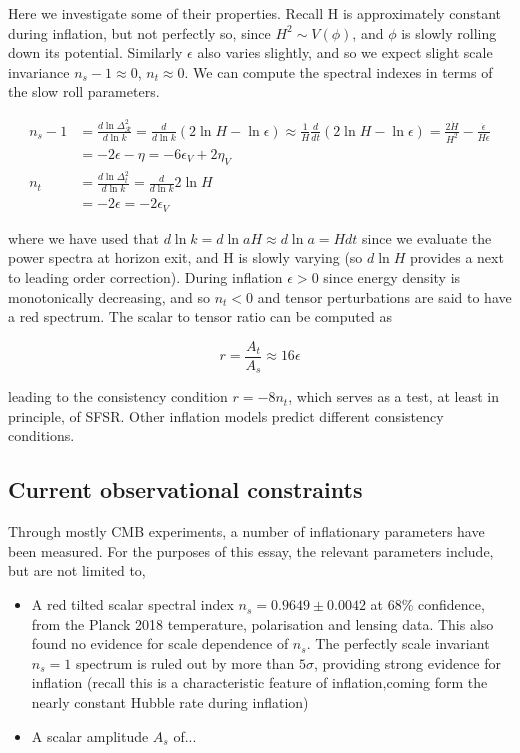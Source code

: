 \documentclass[a4paper,10pt]{article}
\begin{document}
Here we investigate some of their properties. Recall H is approximately constant during inflation, but not perfectly so, since $H^2 \sim V(\phi)$, and $\phi$ is slowly rolling down its potential. Similarly $\epsilon$ also varies slightly, and so we expect slight scale invariance $n_s-1\approx0$, $n_t\approx0$. We can compute the spectral indexes in terms of the slow roll parameters. 

\begin{equation}\begin{split}
n_s-1 &= \frac{d\ln{\Delta^2_{\mathcal{R}}}}{d\ln{k}} = \frac{d}{d\ln{k}}(2\ln{H}-\ln{\epsilon}) \approx \frac{1}{H}\frac{d}{dt}(2\ln{H}-\ln{\epsilon}) = \frac{2\dot{H}}{H^2}-\frac{\dot{\epsilon}}{H\epsilon}\\
& = -2\epsilon-\eta = -6\epsilon_V+2\eta_V\\
n_t &= \frac{d\ln{\Delta^2_t}}{d\ln{k}} = \frac{d}{d\ln{k}}2\ln{H}\\
&=-2\epsilon=-2\epsilon_V
\end{split}\end{equation}

where we have used that $d\ln{k} = d\ln{aH} \approx d\ln{a} = Hdt$ since we evaluate the power spectra at horizon exit, and H is slowly varying (so $d\ln{H}$ provides a next to leading order correction). During inflation $\epsilon>0$ since energy density is monotonically decreasing, and so $n_t<0$ and tensor perturbations are said to have a red spectrum. The scalar to tensor ratio can be computed as

\begin{equation}
r=\frac{A_t}{A_s} \approx 16\epsilon
\end{equation}

leading to the consistency condition $r=-8n_t$, which serves as a test, at least in principle, of SFSR. Other inflation models predict different consistency conditions.


\subsection{Current observational constraints}


Through mostly CMB experiments, a number of inflationary parameters have been measured. For the purposes of this essay, the relevant parameters include, but are not limited to,

\begin{itemize}
\item A red tilted scalar spectral index $n_s =0.9649 \pm 0.0042$ at 68\% confidence, from the Planck 2018 temperature, polarisation and lensing data. This also found no evidence for scale dependence of $n_s$. The perfectly scale invariant $n_s=1$ spectrum is ruled out by more than $5\sigma$, providing strong evidence for inflation (recall this is a characteristic feature of inflation,coming form the nearly constant Hubble rate during inflation)
\item A scalar amplitude $A_s$ of...
\end{itemize}
\end{document}
